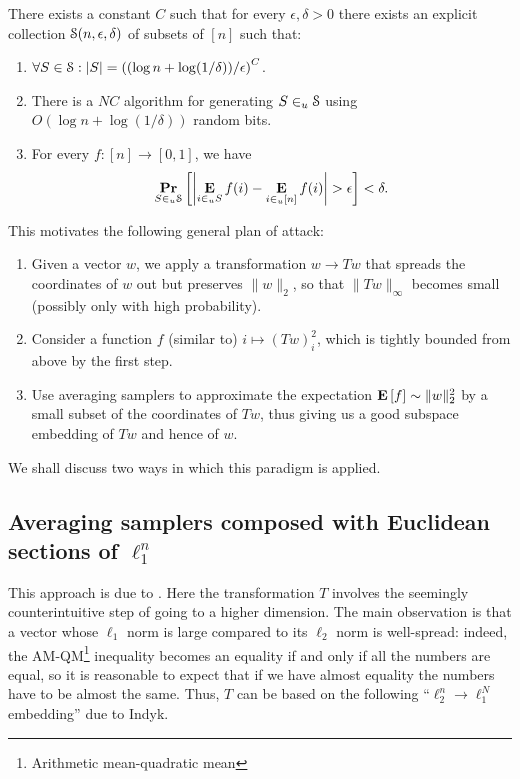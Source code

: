\begin{theorem}
  There exists a constant $C$ such that for every $\epsilon,\delta>0$
  there exists an explicit collection $\S(n,\epsilon,\delta)$ of subsets
  of $[n]$ such that:
  \begin{enumerate}
    \item $\forall S\in\S: |S|=\l((\log n +
      \log(1/\delta))/\epsilon\r)^C$.
    \item There is a $NC$ algorithm for generating $S\inr\S$ using
      $O(\log n +\log(1/\delta))$ random bits.
    \item For every $f:[n]\to[0,1]$, we have
      \[
      \Pr_{S\inr \S}\l[\l|\E_{i\inr S}f(i) -
        \E_{i\inr[n]}f(i)\r|>\epsilon\r]<\delta.
      \]
  \end{enumerate}
\end{theorem}

 This motivates the following general plan of attack:
\begin{enumerate}
\item Given a vector $w$, we apply a transformation $w\to Tw$ that
  spreads the coordinates of $w$ out but preserves $\|w\|_2$, so that
  $\|Tw\|_\infty$ becomes small (possibly only with high probability).
\item Consider a function $f$ (similar to) $i \mapsto (Tw)_i^2$, which
  is tightly bounded from above by the first step.
\item Use averaging samplers to approximate the expectation
  $\E\l[f\r]\sim \|w\|_2^2$ by a small subset of the coordinates of
  $Tw$, thus giving us a good subspace embedding of $Tw$ and hence of
  $w$.
\end{enumerate}
We shall discuss two ways in which this paradigm is applied.

\subsection{Averaging samplers composed with Euclidean sections of
  $\ell_1^n$}

This approach is due to \cite{karnin2011explicit}. Here the
transformation $T$ involves the seemingly counterintuitive step of
going to a higher dimension. The main observation is that a vector
whose $\ell_1$ norm is large compared to its $\ell_2$ norm is
well-spread: indeed, the AM-QM\footnote{Arithmetic mean-quadratic
  mean} inequality becomes an equality if and only if all the numbers
are equal, so it is reasonable to expect that if we have almost
equality the numbers have to be almost the same. Thus, $T$ can be
based on the following ``$\ell_2^n\to \ell_1^N$ embedding'' due to
Indyk.

